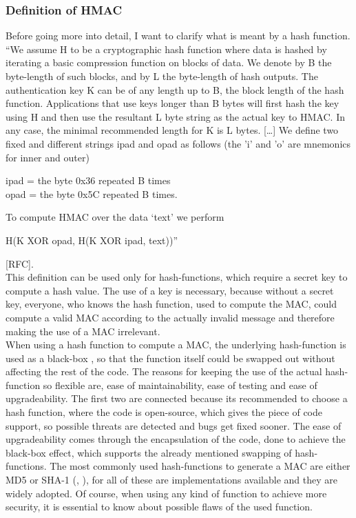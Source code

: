\subsubsection{Definition of HMAC}
Before going more into detail, I want to clarify what is meant by a hash function. “We assume H to be a cryptographic hash function where data is hashed by iterating a basic compression function on blocks of data. We denote by B the byte-length of such blocks, and by L the byte-length of hash outputs. The authentication key K can be of any length up to B, the block length of the hash function. Applications that use keys longer than B bytes will first hash the key using H and then use the resultant L byte string as the actual key to HMAC. In any case, the minimal recommended length for K is L bytes. […] We define two fixed and different strings ipad and opad as follows (the ’i’ and ’o’ are mnemonics for inner and outer)
\begin{center}
ipad = the byte 0x36 repeated B times \\
opad = the byte 0x5C repeated B times.
\end{center}
To compute HMAC over the data ‘text’ we perform 
\begin{center}
H(K XOR opad, H(K XOR ipad, text))”
\end{center}
[RFC].  \\
 This definition can be used only for hash-functions, which require a secret key to compute a hash value. The use of a key is necessary, because without a secret key, everyone, who knows the hash function, used to compute the MAC, could compute a valid MAC according to the actually invalid message and therefore making the use of a MAC irrelevant. \\
When using a hash function to compute a MAC, the underlying hash-function is used as a black-box \cite{KHF}, so that the function itself could be swapped out without affecting the rest of the code. The reasons for keeping the use of the actual hash-function so flexible are, ease of maintainability, ease of testing and ease of upgradeability. The first two are connected because its recommended to choose a hash function, where the code is open-source, which gives the piece of code support, so possible threats are detected and bugs get fixed sooner. The ease of upgradeability comes through the encapsulation of the code, done to achieve the black-box effect, which supports the already mentioned swapping of hash-functions.
The most commonly used hash-functions to generate a MAC are either MD5 or SHA-1 (\cite{CRY-MD5}, \cite{NPC}), for all of these are implementations available and they are widely adopted. Of course, when using any kind of function to achieve more security, it is essential to know about possible flaws of the used function. 
